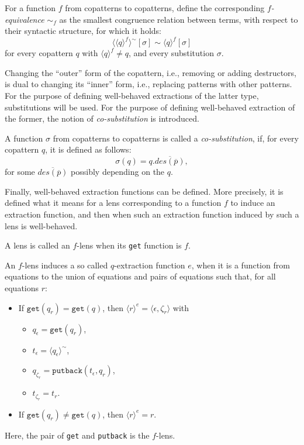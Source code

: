 \begin{definition}[$f$-equivalence]
For a function $f$ from copatterns to copatterns, define the corresponding \textit{$f$-equivalence} $\sim_f$ as the smallest congruence relation between terms, with respect to their syntactic structure, for which it holds:
\[
\langle \langle q \rangle^f \rangle^{\sim}[\sigma] \sim \langle q \rangle^f[\sigma]
\]
for every copattern $q$ with $\langle q \rangle^f \neq q$, and every substitution $\sigma$.
\end{definition}

Changing the ``outer'' form of the copattern, i.e., removing or adding destructors, is dual to changing its ``inner'' form, i.e., replacing patterns with other patterns. For the purpose of defining well-behaved extractions of the latter type, substitutions will be used. For the purpose of defining well-behaved extraction of the former, the notion of \textit{co-substitution} is introduced.

\begin{definition}[Co-substitution]
A function $\sigma$ from copatterns to copatterns is called a \textit{co-substitution}, if, for every copattern $q$, it is defined as follows:
\[
\sigma(q) = q.\overline{des(\overline{p})},
\]
for some $\overline{des(\overline{p})}$ possibly depending on the $q$.
\end{definition}

Finally, well-behaved extraction functions can be defined. More precisely, it is defined what it means for a lens corresponding to a function $f$ to induce an extraction function, and then when such an extraction function induced by such a lens is well-behaved.

\begin{definition}[$f$-lens]
A lens is called an $f$-lens when its \texttt{get} function is $f$.
\end{definition}

\begin{definition}
An $f$-lens induces a so called $q$-extraction function $e$, when it is a function from equations to the union of equations and pairs of equations such that, for all equations $r$:
\begin{itemize}
\item If $\mathtt{get}(q_r) = \mathtt{get}(q)$, then $\langle r \rangle^e = \big\langle \epsilon, \zeta_r \big\rangle$ with
\begin{itemize}
\item $q_\epsilon = \mathtt{get}(q_r)$,
\item $t_\epsilon = \langle q_\epsilon \rangle^{\sim}$,
\item $q_{\zeta_r} = \mathtt{putback}(t_\epsilon, q_r)$,
\item $t_{\zeta_r} = t_r$.
\end{itemize}

\item If $\mathtt{get}(q_r) \neq \mathtt{get}(q)$, then $\langle r \rangle^e = r$.
\end{itemize}
Here, the pair of \texttt{get} and \texttt{putback} is the $f$-lens.
\end{definition}

